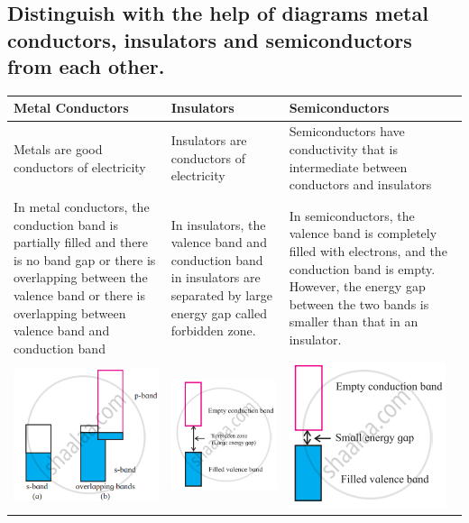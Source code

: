 \documentclass{article}
\begin{document}
   \subsection{Distinguish with the help of diagrams metal conductors,
   insulators and semiconductors from each other.}

   \begin{center}
   \begin{tabular}{ | m{15em} | m{15em} | m{15em} | }
   \hline
   \textbf{Metal Conductors} & \textbf{Insulators} &
   \textbf{Semiconductors}\\
   \hline
   Metals are good conductors of electricity & Insulators are
   conductors of electricity & Semiconductors have conductivity that
   is intermediate between conductors and insulators \\
   \hline
   In metal conductors, the conduction band is partially filled and
   there is no band gap or there is overlapping between the valence
   band or there is overlapping between valence band and conduction
   band & In insulators, the valence band and conduction band in 
   insulators are separated by large energy gap called forbidden 
   zone. & In semiconductors, the valence band is completely filled
   with electrons, and the conduction band is empty. However, the
   energy gap between the two bands is smaller than that in an
   insulator. \\
   \hline
   \includegraphics[scale=0.3]{metals}  &  
   \includegraphics[scale=0.3]{insulators} &
   \includegraphics[scale=0.3]{semicon} \\
   \hline
   \end{tabular}
   \end{center}
\end{document}
